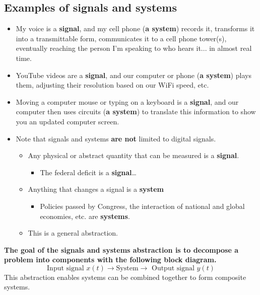 \documentclass[10pt]{article}
\begin{document}
\subsection*{Examples of signals and systems}
\begin{itemize}
    \item My voice is a \textbf{signal}, and my cell phone (\textbf{a system}) records it, transforms it into a transmittable form, communicates it to a cell phone tower(s), eventually reaching the person I'm speaking to who hears it... in almost real time.
    \item YouTube videos are a \textbf{signal}, and our computer or phone (\textbf{a system}) plays them, adjusting their resolution based on our WiFi speed, etc.
    \item Moving a computer mouse or typing on a keyboard is a \textbf{signal}, and our computer then uses circuits (\textbf{a system}) to translate this information to show you an updated computer screen.
    \item Note that signals and systems \textbf{are not} limited to digital signals.
    \begin{itemize}
        \item Any physical or abstract quantity that can be measured is a \textbf{signal}.
        \begin{itemize}
            \item The federal deficit is a \textbf{signal}\dots
        \end{itemize}
        \item Anything that changes a signal is a \textbf{system}
        \begin{itemize}
            \item Policies passed by Congress, the interaction of national and global economies, etc. are \textbf{systems}.
        \end{itemize}
        \item This is a general abstraction.
    \end{itemize}    
\end{itemize}
\textbf{The goal of the signals and systems abstraction is to decompose a problem into components with the following block diagram.}
\[\text{Input signal } x(t) \longrightarrow \boxed{\text{System}} \longrightarrow \text{ Output signal }y(t)\]
This abstraction enables systems can be combined together to form composite systems.
\end{document}
